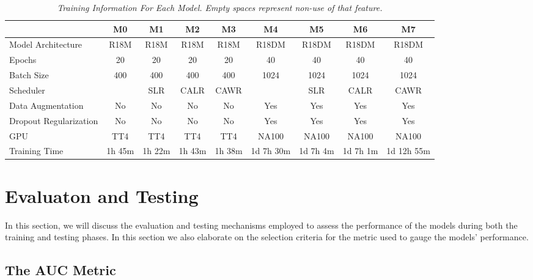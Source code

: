 \begin{landscape}

  \begin{table}
    \centering
    \begin{tabular}{lcccccccc}
      \toprule
      & \textbf{M0} & \textbf{M1} & \textbf{M2} & \textbf{M3} & \textbf{M4} & \textbf{M5} & \textbf{M6} & \textbf{M7} \\
      \midrule
      Model Architecture & R18M & R18M & R18M & R18M & R18DM & R18DM & R18DM & R18DM \\
      Epochs & 20 & 20 & 20 & 20 & 40 & 40 & 40 & 40 \\
      Batch Size & 400 & 400 & 400 & 400 & 1024 & 1024 & 1024 & 1024 \\
      Scheduler & & SLR & CALR & CAWR &  & SLR & CALR & CAWR  \\
      Data Augmentation & No & No & No & No  & Yes & Yes & Yes & Yes \\
      Dropout Regularization & No & No & No & No  & Yes & Yes & Yes & Yes \\
      GPU & TT4 & TT4 & TT4 & TT4 & NA100 & NA100 & NA100 & NA100 \\
      Training Time & 1h 45m & 1h 22m & 1h 43m & 1h 38m & 1d 7h 30m & 1d 7h 4m & 1d 7h 1m & 1d 12h 55m \\ \bottomrule
    \end{tabular}
    \caption[Training Information For Each Model.]
    {\textit{Training Information For Each Model. Empty spaces represent non-use of that feature.
    }}
    {\label{table:trained-models-information}}
  \end{table}
\end{landscape}

\newpage

\section{Evaluaton and Testing}

In this section, we will discuss the evaluation and testing mechanisms employed
to assess the performance of the models during both the training and testing
phases. In this section we also elaborate on the selection criteria for the
metric used to gauge the models' performance.

\subsection{The AUC Metric}


